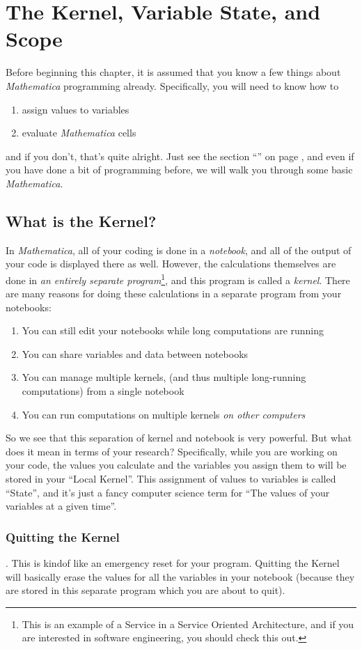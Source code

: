 \chapter[Kernel, State, Scope]{The Kernel, Variable State, and Scope}
\label{chap:Kernel}

Before beginning this chapter, it is assumed that you know a few things about \emph{Mathematica} programming already. Specifically, you will need to know how to
\begin{enumerate}
	   \item assign values to variables
	   \item evaluate \emph{Mathematica} cells
\end{enumerate}
and if you don't, that's quite alright. Just see the section ``\emph{}'' on page \pageref{chap:Prelim}, and even if you have done a bit of programming before, we will walk you through some basic \emph{Mathematica}.

\section{What is the Kernel?}

In \emph{Mathematica}, all of your coding is done in a \emph{notebook}, and all of the output of your code is displayed there as well. However, the calculations themselves are done in \emph{an entirely separate program}\footnote{This is an example of a Service in a Service Oriented Architecture, and if you are interested in software engineering, you should check this out.}, and this program is called a \emph{kernel}. There are many reasons for doing these calculations in a separate program from your notebooks:

\begin{enumerate}
	   \item You can still edit your notebooks while long computations are running
	   \item You can share variables and data between notebooks
	   \item You can manage multiple kernels, (and thus multiple long-running computations) from a single notebook
	   \item You can run computations on multiple kernels \emph{on other computers}
\end{enumerate}



So we see that this separation of kernel and notebook is very powerful. But what does it mean in terms of your research? Specifically, while you are working on your code, the values you calculate and the variables you assign them to will be stored in your ``Local Kernel''. This assignment of values to variables is called ``State'', and it's just a fancy computer science term for ``The values of your variables at a given time''.

\subsection{Quitting the Kernel}. This is kindof like an emergency reset for your program. Quitting the Kernel will basically erase the values for all the variables in your notebook (because they are stored in this separate program which you are about to quit).
